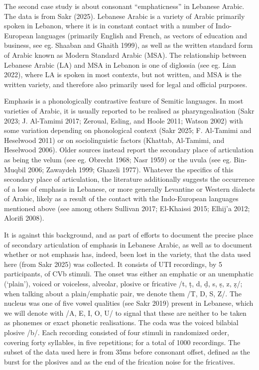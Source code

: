 \documentclass[
]{interact}
\begin{document}
The second case study is about consonant ``emphaticness'' in Lebanese
Arabic. The data is from Sakr (2025). Lebanese Arabic is a variety of
Arabic primarily spoken in Lebanon, where it is in constant contact with
a number of Indo-European languages (primarily English and French, as
vectors of education and business, see eg. Shaaban and Ghaith 1999), as
well as the written standard form of Arabic known as Modern Standard
Arabic (MSA). The relationship between Lebanese Arabic (LA) and MSA in
Lebanon is one of diglossia (see eg. Lian 2022), where LA is spoken in
most contexts, but not written, and MSA is the written variety, and
therefore also primarily used for legal and official purposes.

Emphasis is a phonologically contrastive feature of Semitic languages.
In most varieties of Arabic, it is usually reported to be realised as
pharyngealisation (Sakr 2023; J. Al-Tamimi 2017; Zeroual, Esling, and
Hoole 2011; Watson 2002) with some variation depending on phonological
context (Sakr 2025; F. Al-Tamimi and Heselwood 2011) or on
sociolinguistic factors (Khattab, Al-Tamimi, and Heselwood 2006). Older
sources instead report the secondary place of articulation as being the
velum (see eg. Obrecht 1968; Nasr 1959) or the uvula (see eg. Bin-Muqbil
2006; Zawaydeh 1999; Ghazeli 1977). Whatever the specifics of this
secondary place of articulation, the literature additionally suggests
the occurrence of a loss of emphasis in Lebanese, or more generally
Levantine or Western dialects of Arabic, likely as a result of the
contact with the Indo-European languages mentioned above (see among
others Sullivan 2017; El-Khaissi 2015; Elhij'a 2012; Alorifi 2008).

It is against this background, and as part of efforts to document the
precise place of secondary articulation of emphasis in Lebanese Arabic,
as well as to document whether or not emphasis has, indeed, been lost in
the variety, that the data used here (from Sakr 2025) was collected. It
consists of UTI recordings, by 5 participants, of CVb stimuli. The onset
was either an emphatic or an unemphatic (`plain'), voiced or voiceless,
alveolar, plosive or fricative /t, ṭ, d, ḍ, s, ṣ, z, ẓ/; when talking
about a plain/emphatic pair, we denote them /T, D, S, Z/. The nucleus
was one of five vowel qualities (see Sakr 2019) present in Lebanese,
which we will denote with /A, E, I, O, U/ to signal that these are
neither to be taken as phonemes or exact phonetic realisations. The coda
was the voiced bilabial plosive /b/. Each recording consisted of four
stimuli in randomized order, covering forty syllables, in five
repetitions; for a total of 1000 recordings. The subset of the data used
here is from 35ms before consonant offset, defined as the burst for the
plosives and as the end of the frication noise for the fricatives.
\end{document}
